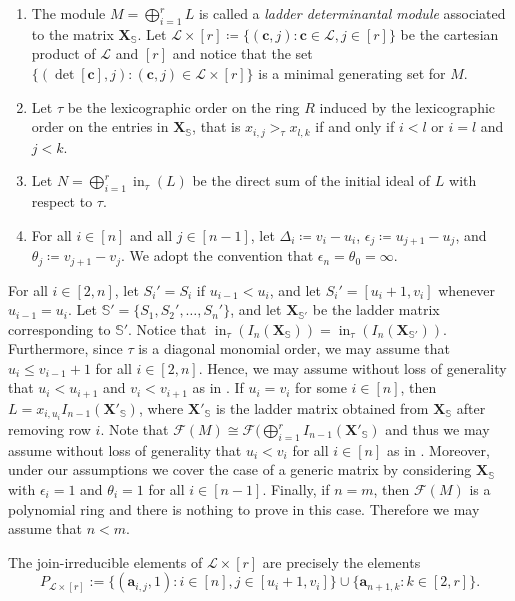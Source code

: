 \documentclass[10pt,a4paper]{amsart}
\def\ini{\operatorname{in}}
\newcommand\bda{{\bm a}}
\newcommand\bdc{{\bm c}}
\newcommand\bfS{\mathbb{S}}
\newcommand\bfX{\mathbf{X}}
\newcommand\calF{\mathcal{F}}
\newcommand\calL{\mathcal{L}}
\newcommand{\Lr}{\ensuremath{\calL\times[r]}}
\begin{document}
\begin{Definition}
\begin{enumerate}[a]
     \item The module $M=\bigoplus_{i=1}^rL$ is called a \emph{ladder determinantal module} associated to the matrix $\bfX_{\bfS}$. Let $\calL\times [r]  \coloneqq \{(\bdc, j) : \bdc\in \calL, j\in [r]\}$ be the cartesian product of $\calL$ and $[r]$ and notice that the set $\{(\det[\bdc], j): (\bdc, j)\in \Lr\}$ is a minimal generating set for $M$.
     \item Let $\tau$ be the lexicographic order on the ring $R$ induced by the lexicographic order on the entries in $\bfX_{\bfS}$, that is $x_{i,j}>_{\tau}x_{l,k}$ if and only if $i<l$ or $i=l$ and $j<k$.
     \item Let $N=\bigoplus_{i=1}^r \ini_{\tau}(L)$ be the direct sum of the initial ideal of $L$ with respect to $\tau$.
     \item For all $i\in[n]$ and all $j\in [n-1]$, let $\Delta_i\coloneq v_i-u_i$, $\epsilon_j\coloneq u_{j+1}-u_j$, and  $\theta_j\coloneq v_{j+1}-v_j$. We adopt the convention that $\epsilon_n = \theta_0=\infty$.
\end{enumerate}
\end{Definition}

\begin{Remark}\label{shrinkmatrix}
For all $i \in [2,n]$, let $S_i' = S_i$ if $u_{i-1} < u_i$, and let $S_i' = [u_i + 1, v_i]$ whenever $u_{i-1} = u_i$.  
Let $\bfS' = \{S_1, S_2', \ldots, S_n'\}$, and let ${\bfX}_{\bfS'}$ be the ladder matrix corresponding to $\bfS'$.  
Notice that $\ini_{\tau}(I_n(\bfX_{\bfS})) = \ini_{\tau}(I_n(\bfX_{\bfS'}))$.  
Furthermore, since $\tau$ is a diagonal monomial order, we may assume that $u_i \le v_{i-1} + 1$ for all $i \in [2,n]$.  
Hence, 
we may assume without loss of generality that $u_i < u_{i+1}$ and $v_i < v_{i+1}$ as in  . If $u_i=v_i$ for some $i\in [n]$, then $L=x_{i,u_i}I_{n-1}(\bfX'_{\bfS})$, where $\bfX'_{\bfS}$ is the ladder matrix obtained from $\bfX_{\bfS}$ after removing row $i$. Note that $\calF(M) \cong \calF(\bigoplus_{i=1}^r I_{n-1}(\bfX'_{\bfS})$ and thus we may assume without loss of generality that $u_i<v_i$ for all $i\in [n]$ as in . Moreover, under our assumptions we cover the case of a generic matrix by considering $\bfX_{\bfS}$ with $\epsilon_i=1$ and $\theta_i=1$ for all $i\in [n-1]$. Finally, if $n=m$, then $\calF(M)$ is a polynomial ring and there is nothing to prove in this case. Therefore we may assume that $n<m$. 
\end{Remark}

\begin{Corollary}\label{cor: join irr}
    The join-irreducible elements of $\calL\times [r]$ are precisely the elements \[ P_{\Lr} := \{(\bda_{i,j},1): i\in[n], j\in[u_i+1, v_i]\}\cup \{\bda_{n+1,k}: k\in [2,r]\}.\]
\end{Corollary}
\end{document}
